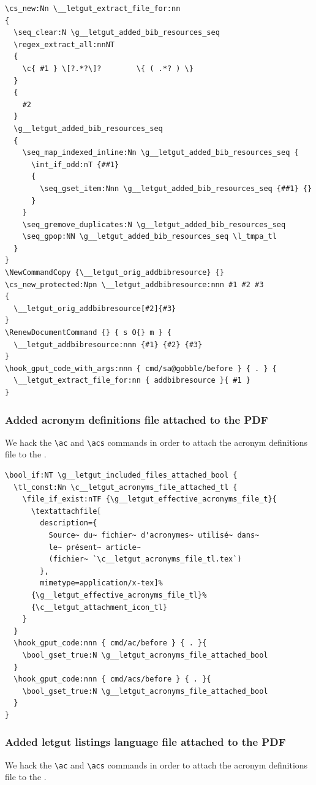 \documentclass{letgut}
\begin{document}
\begin{lstlisting}
\cs_new:Nn \__letgut_extract_file_for:nn
{
  \seq_clear:N \g__letgut_added_bib_resources_seq
  \regex_extract_all:nnNT
  {
    \c{ #1 } \[?.*?\]?        \{ ( .*? ) \}
  }
  {
    #2
  }
  \g__letgut_added_bib_resources_seq
  {
    \seq_map_indexed_inline:Nn \g__letgut_added_bib_resources_seq {
      \int_if_odd:nT {##1}
      {
        \seq_gset_item:Nnn \g__letgut_added_bib_resources_seq {##1} {}
      }
    }
    \seq_gremove_duplicates:N \g__letgut_added_bib_resources_seq
    \seq_gpop:NN \g__letgut_added_bib_resources_seq \l_tmpa_tl
  }
}
\NewCommandCopy {\__letgut_orig_addbibresource} {}
\cs_new_protected:Npn \__letgut_addbibresource:nnn #1 #2 #3
{
  \__letgut_orig_addbibresource[#2]{#3}
}
\RenewDocumentCommand {} { s O{} m } {
  \__letgut_addbibresource:nnn {#1} {#2} {#3}
}
\hook_gput_code_with_args:nnn { cmd/sa@gobble/before } { . } {
  \__letgut_extract_file_for:nn { addbibresource }{ #1 }
}
\end{lstlisting}
\subsubsection{Added acronym definitions file attached to the PDF}
\label{ImplementationMiscellanousAddedbibliographicressourcesattachedtothePDF-l4e34ja00pj0}
We hack the \lstinline+\ac+ and \lstinline+\acs+ commands in order to attach the acronym definitions
file to the \pdf{}.

\begin{lstlisting}
\bool_if:NT \g__letgut_included_files_attached_bool {
  \tl_const:Nn \c__letgut_acronyms_file_attached_tl {
    \file_if_exist:nTF {\g__letgut_effective_acronyms_file_t}{
      \textattachfile[
        description={
          Source~ du~ fichier~ d'acronymes~ utilisé~ dans~
          le~ présent~ article~
          (fichier~ `\c__letgut_acronyms_file_tl.tex`)
        },
        mimetype=application/x-tex]%
      {\g__letgut_effective_acronyms_file_tl}%
      {\c__letgut_attachment_icon_tl}
    }
  }
  \hook_gput_code:nnn { cmd/ac/before } { . }{
    \bool_gset_true:N \g__letgut_acronyms_file_attached_bool
  }
  \hook_gput_code:nnn { cmd/acs/before } { . }{
    \bool_gset_true:N \g__letgut_acronyms_file_attached_bool
  }
}
\end{lstlisting}
\subsubsection{Added letgut listings language file attached to the PDF}
\label{ImplementationMiscellanousAddedbibliographicressourcesattachedtothePDF-l4e34ja00pj0}
We hack the \lstinline+\ac+ and \lstinline+\acs+ commands in order to attach the acronym definitions
file to the \pdf{}.
\end{document}
